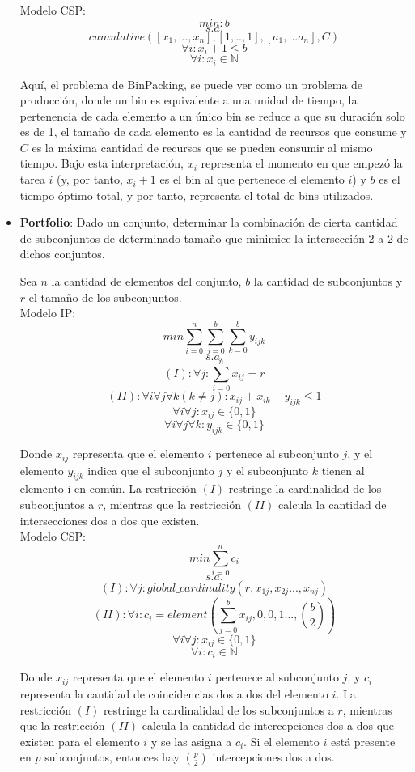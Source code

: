\documentclass[12pt]{report}
\begin{document}
\begin{itemize}
Modelo CSP:
$$min: b$$
$$s.a.$$
$$cumulative([x_1,...,x_n],[1,..,1],[a_1,...a_n],C)$$
$$\forall i: x_i+1\leq b$$
$$\forall i: x_i\in \mathbb{N}$$

Aquí, el problema de BinPacking, se puede ver como un problema de producción, donde un bin es equivalente a una unidad de tiempo, la pertenencia de cada elemento a un único bin se reduce a que su duración solo es de 1, el tamaño de cada elemento es la cantidad de recursos que consume y $C$ es la máxima cantidad de recursos que se pueden consumir al mismo tiempo. Bajo esta interpretación, $x_i$ representa el momento en que empezó la tarea $i$ (y, por tanto, $x_i+1$ es el bin al que pertenece el elemento $i$) y $b$ es el tiempo óptimo total, y por tanto, representa el total de bins utilizados.

\item \textbf{Portfolio}: Dado un conjunto, determinar la combinación de cierta cantidad de subconjuntos de determinado tamaño que minimice la intersección 2 a 2 de dichos conjuntos.

Sea $n$ la cantidad de elementos del conjunto, $b$ la cantidad de subconjuntos y $r$ el tamaño de los subconjuntos.\\

Modelo IP:
$$min \sum_{i=0}^n\sum_{j=0}^b\sum_{k=0}^by_{ijk}$$
$$s.a.$$
$$(I):\forall j:\sum_{i=0}^n x_{ij}=r$$
$$(II):\forall i \forall j \forall k(k\neq j):x_{ij}+x_{ik}-y_{ijk}\leq1$$
$$\forall i\forall j: x_{ij}\in\{0,1\}$$
$$\forall i\forall j\forall k: y_{ijk}\in\{0,1\}$$

Donde $x_{ij}$ representa que el elemento $i$ pertenece al subconjunto $j$, y el elemento $y_{ijk}$ indica que el subconjunto $j$ y el subconjunto $k$ tienen al elemento i en común. La restricción $(I)$ restringe la cardinalidad de los subconjuntos a $r$, mientras que la restricción $(II)$ calcula la cantidad de intersecciones dos a dos que existen.\\

Modelo CSP:
$$min \sum_{i=0}^n c_i$$
$$s.a.$$
$$ (I):\forall j:global\_cardinality(r,x_{1j},x_{2j}...,x_{nj})$$
$$ (II):\forall i:c_i=element(\sum_{j=0}^b x_{ij},0,0,1...,\binom{b}{2})$$
$$\forall i\forall j: x_{ij}\in\{0,1\}$$
$$\forall i: c_i\in \mathbb{N}$$

Donde $x_{ij}$ representa que el elemento $i$ pertenece al subconjunto $j$, y $c_i$ representa la cantidad de coincidencias dos a dos del elemento $i$. La restricción $(I)$ restringe la cardinalidad de los subconjuntos a $r$, mientras que la restricción $(II)$ calcula la cantidad de intercepciones dos a dos que existen para el elemento $i$ y se las asigna a $c_i$. Si el elemento $i$ está presente en $p$ subconjuntos, entonces hay $\binom{p}{2}$ intercepciones dos a dos.


\end{itemize}
\end{document}

